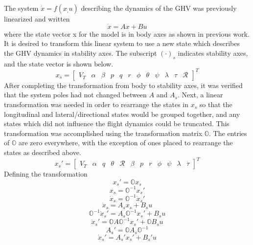 \noindent The system $\dot{x}=f(x_,u)$ describing the dynamics of the GHV was previously linearized and written
\begin{equation*}
  \dot{x}=Ax+Bu
\end{equation*}
where the state vector x for the model is in body axes as shown in previous work.
It is desired to transform this linear system to use a new state which describes the GHV dynamics in stability axes.
The subscript $(\cdot)_{s}$ indicates stability axes, and the state vector is shown below.
\begin{equation*}
  \label{stability_x_1}
  x_{s} =
  [\begin{array}{cccccccccccc}
    V_{T} &  \alpha & \beta & p & q & r & \phi & \theta & \psi & \lambda & \tau & \mathscr{R}
  \end{array}]^T
\end{equation*}
After completing the transformation from body to stability axes, it was verified that the system poles had not changed between $A$ and $A_{s}$.
Next, a linear transformation was needed in order to rearrange the states in $x_{s}$ so that the longitudinal and lateral/directional states would be grouped together, and any states which did not influence the flight dynamics could be truncated.
This transformation was accomplished using the transformation matrix $\mathbb{O}$.
The entries of $\mathbb{O}$ are zero everywhere, with the exception of ones placed to rearrange the states as described above.
\begin{equation*}
  \label{stability_x_2}
  x_{s}' =
  [\begin{array}{ccccc|cccc|ccc} %
    V_{T} &  \alpha & q &\theta & \mathscr{R} & \beta &p & r & \phi &\psi &\lambda & \tau
  \end{array}]^T
\end{equation*}
Defining the transformation
\begin{equation*}
  x_{s}'=\mathbb{O}x_{s}
\end{equation*}
\begin{equation*}
  x_{s}=\mathbb{O}^{-1}x_{s}'
\end{equation*}
\begin{equation*}
  \dot{x}_{s}=\mathbb{O}^{-1}\dot{x}_{s}'
\end{equation*}
\begin{equation*}
  \dot{x}_{s}=A_{s}x_{s}+B_{s}u
\end{equation*}
\begin{equation*}
  \mathbb{O}^{-1}\dot{x}_{s}'=A_{s}\mathbb{O}^{-1}x_{s}'+B_{s}u
\end{equation*}
\begin{equation*}
  \dot{x}_{s}'=\mathbb{O}A\mathbb{O}^{-1}x_{s}'+\mathbb{O}B_{s}u
\end{equation*}
\begin{equation*}
  {A}_{s}'=\mathbb{O}A_{s}\mathbb{O}^{-1}
\end{equation*}
\begin{equation*}
  \dot{x}_{s}'=A_{s}'x_{s}'+B_{s}'u
\end{equation*}

